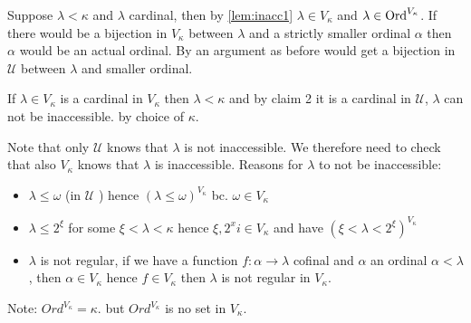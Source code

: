 {\begin{claimproof}
        Suppose $\lambda<\kappa$ and $\lambda$ cardinal, then by \ref{lem:inacc1} $\lambda\in V_\kappa$ and $\lambda\in \operatorname{Ord}^{V_\kappa}$.
        If there would be a bijection in $V_\kappa$ between $\lambda$ and a strictly smaller ordinal 
        $\alpha$ then $\alpha$ would be an actual ordinal. By an argument as before would get a bijection in 
        $\mathcal{U}$ between $\lambda$ and smaller ordinal.
    \end{claimproof}
    If $\lambda\in V_\kappa$ is a cardinal in $V_\kappa$ then $\lambda<\kappa$ and by claim 2 it is a cardinal in $\mathcal{U}$, $\lambda$ can not be inaccessible. by choice of $\kappa$.

    Note that only $\mathcal{U}$ knows that $\lambda$ is not inaccessible. We therefore need to check that also $V_\kappa$ knows that $\lambda$ is inaccessible.
    Reasons for $\lambda$ to not be inaccessible:
    \begin{itemize}
        \item $\lambda\leq \omega$ (in $\mathcal{U}$ ) hence $(\lambda\leq \omega)^{V_\kappa}$ bc. $\omega\in V_\kappa$
        \item $\lambda\leq 2^\xi$ for some $\xi <\lambda<\kappa$ hence
        $\xi,2^xi\in V_\kappa$ and have $(\xi<\lambda<2^\xi)^{V_\kappa}$
        \item $\lambda$ is not regular, if we have a function $f:\alpha\to \lambda$ cofinal and $\alpha$ an ordinal $\alpha<\lambda$, then $\alpha\in V_\kappa$ hence $f\in V_\kappa$ then $\lambda$ is not regular in $V_\kappa$.
    \end{itemize}
}

Note: $Ord^{V_\kappa}=\kappa$. but $Ord^{V_\kappa}$ is no set in $V_\kappa$.
